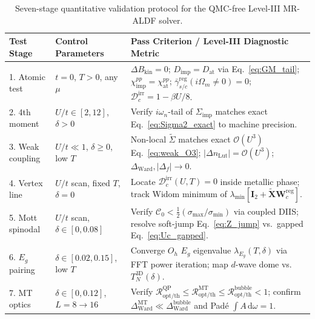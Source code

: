 \documentclass[11pt,a4paper]{article}
\numberwithin{equation}{section}
\theoremstyle{plain}
\theoremstyle{definition}
\providecommand{\dd}{\mathrm{d}}
\begin{document}
\begin{table}[htbp]
\centering
\renewcommand{\arraystretch}{1.20}
\caption{Seven-stage quantitative validation protocol for the QMC-free Level-III MR-ALDF solver.}
\label{tab:L3_bench}
\vspace{0.4em}
\small
\begin{tabular}{p{2.9cm}p{3.2cm}p{8.4cm}}
\hline\hline
\textbf{Test Stage} & \textbf{Control Parameters} & \textbf{Pass Criterion / Level-III Diagnostic Metric} \\
\hline
1. Atomic test & $t = 0$, $T > 0$, any $\mu$
    & $\Delta B_{\mathrm{kin}} = 0$; $D_{\mathrm{imp}} = D_{\mathrm{at}}$ via Eq.~\eqref{eq:GM_tail}; $\chi_{\mathrm{imp}}^{pp} = \chi_{\mathrm{at}}^{pp}$; $\bar{\gamma}_{s/c}^{\mathrm{reg}}(i\Omega_m\neq 0)=0$; $\mathcal{D}_c^{\mathrm{irr}} = 1 - \beta U/8$. \\
2. 4th moment & $U/t \in [2,12]$, $\delta > 0$
    & Verify $i\omega_n$-tail of $\Sigma_{\mathrm{imp}}$ matches exact Eq.~\eqref{eq:Sigma2_exact} to machine precision. \\
3. Weak coupling & $U/t \ll 1$, $\delta \ge 0$, low $T$
    & Non-local $\tilde{\Sigma}$ matches exact $\mathcal{O}(U^3)$ Eq.~\eqref{eq:weak_O3}; $|\Delta n_{\mathrm{Lut}}| = \mathcal{O}(U^3)$; $\Delta_{\mathrm{Ward}}, |\Delta_f| \to 0$. \\
4. Vertex line & $U/t$ scan, fixed $T$, $\delta = 0$
    & Locate $\mathcal{D}_c^{\mathrm{irr}}(U,T) = 0$ inside metallic phase; track Widom minimum of $\lambda_{\min}[\mathbf{I}_2 + \tilde{\mathbf{X}}\mathbf{W}_c^{\mathrm{reg}}]$. \\
5. Mott spinodal & $U/t$ scan, $\delta \in [0, 0.08]$
    & Verify $\mathcal{C}_0 < \frac{1}{2}(\sigma_{\max}/\sigma_{\min})$ via coupled DIIS; resolve soft-jump Eq.~\eqref{eq:Z_jump} vs.\ gapped Eq.~\eqref{eq:Uc_gapped}. \\
6. $E_g$ pairing & $\delta \in [0.02, 0.15]$, low $T$
    & Converge $O_h$ $E_g$ eigenvalue $\lambda_{E_g}(T,\delta)$ via FFT power iteration; map $d$-wave dome vs.\ $T_N^{\mathrm{3D}}(\delta)$. \\
7. MT optics & $\delta \in [0, 0.12]$, $L = 8 \to 16$
    & Verify $\mathcal{R}_{\mathrm{opt/th}}^{\mathrm{QP}} \le \mathcal{R}_{\mathrm{opt/th}}^{\mathrm{MT}} \le \mathcal{R}_{\mathrm{opt/th}}^{\mathrm{bubble}} < 1$; confirm $\Delta_{\mathrm{Ward}}^{\mathrm{MT}} \ll \Delta_{\mathrm{Ward}}^{\mathrm{bubble}}$ and Pad\'e $\int A\,\dd\omega = 1$. \\
\hline\hline
\end{tabular}
\end{table}
\end{document}
